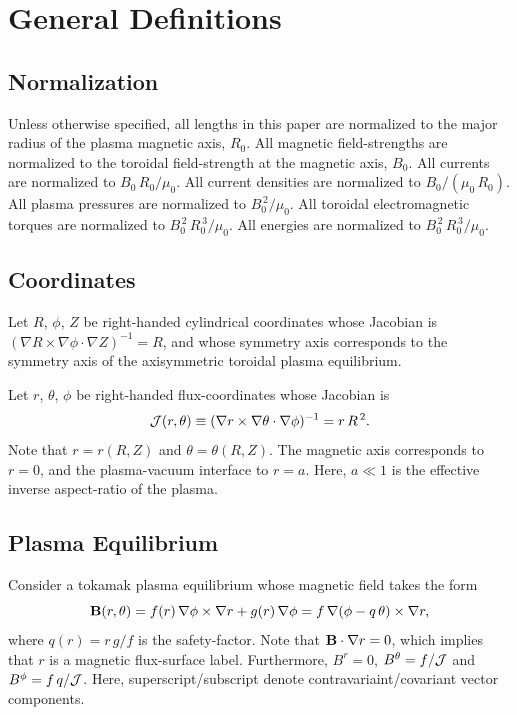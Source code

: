 \documentclass[12pt,prb,aps]{revtex4-1}
\begin{document}
\appendix

\section{General Definitions}
\subsection{Normalization}\label{norm}
Unless otherwise specified, all lengths in this paper are normalized to  the major radius of the plasma magnetic axis, $R_0$. All magnetic field-strengths
are normalized to the  toroidal field-strength at the magnetic axis, $B_0$. All currents are normalized to $B_0\,R_0/\mu_0$. All current densities are normalized to $B_0/(\mu_0\,R_0)$.  All plasma pressures are normalized to $B_0^{\,2}/\mu_0$.
All toroidal electromagnetic torques are normalized to $B_0^{\,2}\,R_0^{\,3}/\mu_0$. All energies are normalized to $B_0^{\,2}\,R_0^{\,3}/\mu_0$. 

\subsection{Coordinates}\label{coord}
Let $R$, $\phi$, $Z$ be right-handed cylindrical coordinates whose Jacobian 
is $ (\nabla R\times \nabla\phi\cdot\nabla Z)^{-1} = R$, 
and whose symmetry axis corresponds to the symmetry axis of the axisymmetric toroidal plasma equilibrium. 

Let $r$, $\theta$, $\phi$ be right-handed flux-coordinates whose
Jacobian is
\begin{equation}\label{jac}
{\cal J}(r,\theta)\equiv (\nabla r\times \nabla\theta\cdot\nabla\phi)^{-1}= r\,R^{\,2}.
\end{equation}
Note that $r=r(R,Z)$ and $\theta=\theta(R,Z)$. 
The magnetic axis corresponds to $r=0$, and the plasma-vacuum interface to $r=a$. Here, $a\ll 1$ is the effective inverse aspect-ratio of the plasma. 

\subsection{Plasma Equilibrium}\label{equilb}
Consider a tokamak plasma equilibrium whose magnetic field takes the form
\begin{equation}
{\bf B}(r,\theta) = f(r)\,\nabla\phi\times \nabla r + g(r)\,\nabla\phi = f\,\nabla(\phi-q\,\theta)\times \nabla r,
\end{equation}
where
$q(r) = r\,g/f$ is the safety-factor. Note that ${\bf B}\cdot\nabla r=0$, which implies that $r$ is a magnetic flux-surface label.
Furthermore,   $B^r=0$, $B^\theta= f/{\cal J}$ and  $B^\phi =f\,q/{\cal J}$. Here, superscript/subscript denote contravariaint/covariant
vector components. 
\end{document}
